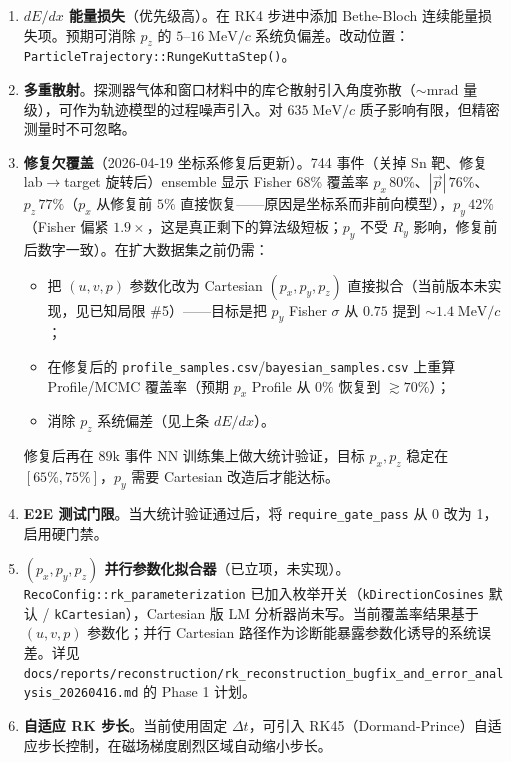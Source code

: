 \documentclass[a4paper, 11pt]{article}
\begin{document}
\begin{enumerate}
  \item \textbf{$dE/dx$ 能量损失}（优先级高）。在 RK4 步进中添加 Bethe-Bloch 连续能量损失项。预期可消除 $p_z$ 的 $5\text{--}16\;\mathrm{MeV}/c$ 系统负偏差。改动位置：\texttt{ParticleTrajectory::RungeKuttaStep()}。

  \item \textbf{多重散射}。探测器气体和窗口材料中的库仑散射引入角度弥散（$\sim\!\mathrm{mrad}$ 量级），可作为轨迹模型的过程噪声引入。对 $635\;\mathrm{MeV}/c$ 质子影响有限，但精密测量时不可忽略。

  \item \textbf{修复欠覆盖}（2026-04-19 坐标系修复后更新）。744 事件（关掉 Sn 靶、修复 lab$\to$target 旋转后）ensemble 显示 Fisher 68\% 覆盖率 $p_x\,80\%$、$|\vec p|\,76\%$、$p_z\,77\%$（$p_x$ 从修复前 $5\%$ 直接恢复——原因是坐标系而非前向模型），$p_y\,42\%$（Fisher 偏紧 $1.9\times$，这是真正剩下的算法级短板；$p_y$ 不受 $R_y$ 影响，修复前后数字一致）。在扩大数据集之前仍需：
  \begin{itemize}[nosep]
    \item 把 $(u,v,p)$ 参数化改为 Cartesian $(p_x,p_y,p_z)$ 直接拟合（当前版本未实现，见已知局限 \#5）——目标是把 $p_y$ Fisher $\sigma$ 从 $0.75$ 提到 $\sim 1.4\;\mathrm{MeV}/c$；
    \item 在修复后的 \texttt{profile\_samples.csv}/\texttt{bayesian\_samples.csv} 上重算 Profile/MCMC 覆盖率（预期 $p_x$ Profile 从 $0\%$ 恢复到 $\gtrsim 70\%$）；
    \item 消除 $p_z$ 系统偏差（见上条 $dE/dx$）。
  \end{itemize}
  修复后再在 $89\mathrm{k}$ 事件 NN 训练集上做大统计验证，目标 $p_x,p_z$ 稳定在 $[65\%, 75\%]$，$p_y$ 需要 Cartesian 改造后才能达标。

  \item \textbf{E2E 测试门限}。当大统计验证通过后，将 \texttt{require\_gate\_pass} 从 0 改为 1，启用硬门禁。

  \item \textbf{$(p_x, p_y, p_z)$ 并行参数化拟合器}（已立项，未实现）。\texttt{RecoConfig::rk\_parameterization} 已加入枚举开关（\texttt{kDirectionCosines} 默认 / \texttt{kCartesian}），Cartesian 版 LM 分析器尚未写。当前覆盖率结果基于 $(u,v,p)$ 参数化；并行 Cartesian 路径作为诊断能暴露参数化诱导的系统误差。详见 \texttt{docs/reports/reconstruction/rk\_reconstruction\_bugfix\_and\_error\_analysis\_20260416.md} 的 Phase 1 计划。

  \item \textbf{自适应 RK 步长}。当前使用固定 $\Delta t$，可引入 RK45（Dormand-Prince）自适应步长控制，在磁场梯度剧烈区域自动缩小步长。
\end{enumerate}
\end{document}

